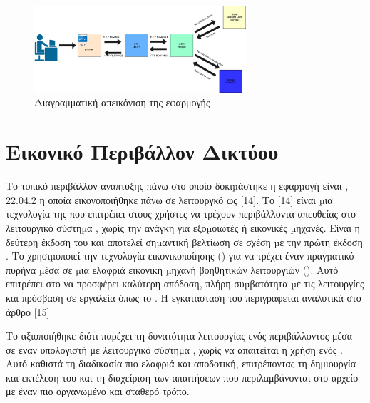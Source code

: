 \begin{figure}[h]
	\centering
	\includegraphics[width=0.7\textwidth]{graphics/MTV.drawio.png}
	\caption{Διαγραμματική απεικόνιση της εφαρμογής}
\end{figure}



\section{Εικονικό Περιβάλλον Δικτύου }


Το τοπικό περιβάλλον ανάπτυξης πάνω στο οποίο δοκιµάστηκε η εφαρµογή είναι ,  22.04.2  η οποία εικονοποιήθηκε πάνω σε λειτουργκό  ως [14]. Το [14] είναι µια τεχνολογία της  που επιτρέπει στους χρήστες  να τρέχουν  περιβάλλοντα απευθείας στο λειτουργικό σύστηµα , χωρίς την ανάγκη για εξοµοιωτές ή εικονικές µηχανές. Είναι η δεύτερη έκδοση του  και αποτελεί σηµαντική βελτίωση σε σχέση µε την πρώτη έκδοση . Το  χρησιµοποιεί την τεχνολογία εικονικοποίησης () για να τρέχει έναν πραγµατικό πυρήνα  µέσα σε µια ελαφριά εικονική µηχανή βοηθητικών λειτουργιών (). Αυτό επιτρέπει στο  να προσφέρει καλύτερη απόδοση, πλήρη συµβατότητα µε τις λειτουργίες  και πρόσβαση σε εργαλεία όπως το . Η εγκατάσταση του  περιγράφεται αναλυτικά στο άρθρο  [15]


Το  αξιοποιήθηκε διότι παρέχει τη δυνατότητα λειτουργίας ενός 
περιβάλλοντος  μέσα σε έναν υπολογιστή με λειτουργικό 
σύστημα , χωρίς να απαιτείται η χρήση ενός . 
Αυτό καθιστά τη διαδικασία πιο ελαφριά και αποδοτική, επιτρέποντας τη 
δημιουργία και εκτέλεση του  και τη διαχείριση των 
απαιτήσεων που περιλαμβάνονται στο αρχείο  με έναν πιο οργανωμένο και σταθερό τρόπο.

